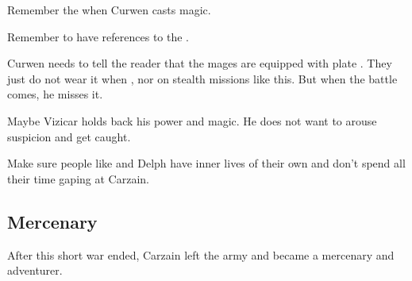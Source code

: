 \begin{changes}
    Remember the  when Curwen casts magic. 
    
    Remember to have references to the . 
    
    Curwen needs to tell the reader that the \ishrah{} mages are equipped with plate \armour. 
    They just do not wear it when \travelling, nor on stealth missions like this. 
    But when the battle comes, he misses it. 
    
    Maybe Vizicar holds back his power and magic. 
    He does not want to arouse suspicion and get caught. 
  
  \begin{comment}\paragraph{\Tsekkect{} and Delph}\end{comment}
    Make sure people like \Tsekkect{} and Delph have inner lives of their own and don't spend all their time gaping at Carzain. 
\end{changes}
















\section{Mercenary}
After this short war ended, Carzain left the army and became a mercenary and adventurer.
























\chapter[Twilight Angel, Remember]{\TwilightAngelRemember}
 


























